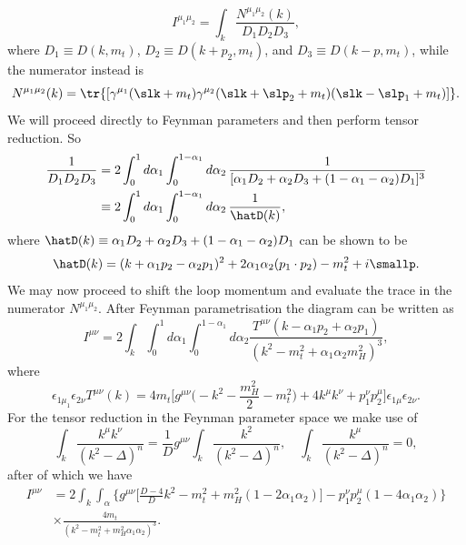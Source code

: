 \begin{equation}
    I^{\mu_1\mu_2} = \int_k \frac{N^{\mu_1\mu_2}(k)}{D_1D_2D_3},
\end{equation}
where $D_1 \equiv D(k,m_t)$, $D_2 \equiv D(k + p_2,m_t)$, and $D_3 \equiv D(k - p,m_t)$, while the numerator instead is 
\begin{equation}
    N^{\mu_1\mu_2}(k) = \tr{[\gamma^{\mu_1}(\slk + m_t)\gamma^{\mu_2}(\slk + \slp_2 +m_t)(\slk - \slp_1 + m_t)]}.
\end{equation}
We will proceed directly to Feynman parameters and then perform tensor reduction. So 
\begin{equation}
    \begin{split}
        \frac{1}{D_1D_2D_3} &= 2\int_0^1d\alpha_1\int_0^{1 - \alpha_1}d\alpha_2\,\frac{1}{[\alpha_1D_2 + \alpha_2D_3 + (1 - \alpha_1 - \alpha_2)D_1]^3} \\
        &\equiv2\int_0^1d\alpha_1\int_0^{1 - \alpha_1}d\alpha_2\,\frac{1}{\hatD(k)},
    \end{split}
\end{equation}
where $\hatD(k) \equiv \alpha_1D_2 + \alpha_2D_3 + (1 - \alpha_1 - \alpha_2)D_1$ can be shown to be 
\begin{equation}
    \hatD(k) = (k + \alpha_1p_2 -\alpha_2p_1)^2 + 2\alpha_1\alpha_2(p_1 \cdot p_2) - m_t^2 + i\smallp.
\end{equation}
We may now proceed to shift the loop momentum and evaluate the trace in the numerator $N^{\mu_1\mu_2}$. After Feynman parametrisation the diagram can be written as 
\begin{equation}
    I^{\mu\nu} = 2\int_k\int_0^1d\alpha_1\int_0^{1 - \alpha_1}d\alpha_2\frac{T^{\mu\nu}(k - \alpha_1p_2 + \alpha_2p_1)}{(k^2 - m_t^2 + \alpha_1\alpha_2m_H^2)^3},
\end{equation}
where 
\begin{equation}
    \epsilon_{1\mu_1}\epsilon_{2\nu}T^{\mu\nu}(k) = 4m_t\bigg[g^{\mu\nu}\bigg(-k^2 - \frac{m_H^2}{2} - m_t^2\bigg) + 4k^\mu k^\nu + p_1^\nu p_2^\mu\bigg]\epsilon_{1\mu}\epsilon_{2\nu}.
\end{equation}
For the tensor reduction in the Feynman parameter space we make use of 
\begin{equation}
    \int_k\frac{k^\mu k^\nu}{(k^2 - \Delta)^n} = \frac{1}{D}g^{\mu\nu}\int_k\frac{k^2}{(k^2 - \Delta)^n},\quad \int_k\frac{k^\mu}{(k^2 - \Delta)^n} = 0,
\end{equation}
after of which we have
\begin{equation}
    \begin{split}
        I^{\mu\nu} &= 2\int_k\int_\alpha\bigg\{g^{\mu\nu}\bigg[\frac{D - 4}{D}k^2 - m_t^2 + m_H^2(1- 2\alpha_1\alpha_2)\bigg] - p_1^\nu p_2^\mu(1 - 4\alpha_1\alpha_2)\bigg\} \\
        &\times\frac{4m_t}{(k^2 - m_t^2 + m_H^2\alpha_1\alpha_2)^3}.
    \end{split}
\end{equation}
